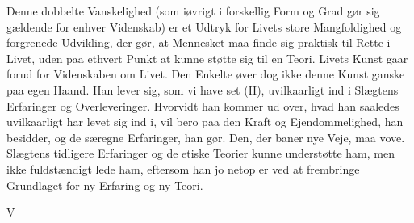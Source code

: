 \documentclass[12pt,a4paper,openany]{book}
\begin{document}
Denne dobbelte Vanskelighed (som iøvrigt i forskellig Form
og Grad gør sig gældende for enhver Videnskab) er et Udtryk
for Livets store Mangfoldighed og forgrenede Udvikling, der gør,
at Mennesket maa finde sig praktisk til Rette i Livet, uden paa
ethvert Punkt at kunne støtte sig til en Teori. Livets Kunst
gaar forud for Videnskaben om Livet. Den Enkelte øver dog
ikke denne Kunst ganske paa egen Haand. Han lever sig, som
vi have set (II), uvilkaarligt ind i Slægtens Erfaringer og Overleveringer.
Hvorvidt han kommer ud over, hvad han saaledes
uvilkaarligt har levet sig ind i, vil bero paa den Kraft og Ejendommelighed,
han besidder, og de særegne Erfaringer, han gør.
Den, der baner nye Veje, maa vove. Slægtens tidligere Erfaringer
og de etiske Teorier kunne understøtte ham, men ikke
fuldstændigt lede ham, eftersom han jo netop er ved at frembringe
Grundlaget for ny Erfaring og ny Teori.

\begin{center}V\end{center}
\end{document}
